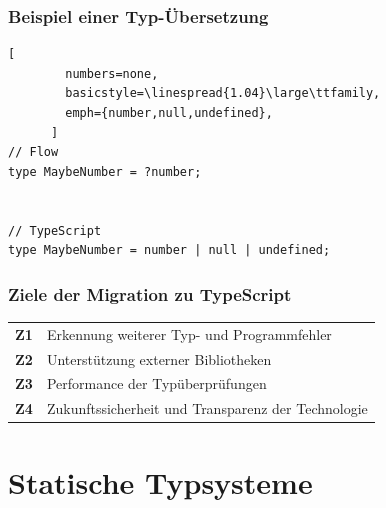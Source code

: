 
    \begin{frame}[fragile]
      \frametitle{Beispiel einer Typ-Übersetzung}

      \begin{lstlisting}[
        numbers=none,
        basicstyle=\linespread{1.04}\large\ttfamily,
        emph={number,null,undefined},
      ]
// Flow
type MaybeNumber = ?number;


// TypeScript
type MaybeNumber = number | null | undefined;
      \end{lstlisting}
    \end{frame}

    \begin{frame}
      \frametitle{Ziele der Migration zu TypeScript}
      {
        \renewcommand{\arraystretch}{1.4}
        \begin{tabu} to 
          \textbf{Z1} & Erkennung weiterer Typ- und Programmfehler \\
          \textbf{Z2} & Unterstützung externer Bibliotheken \\
          \textbf{Z3} & Performance der Typüberprüfungen \\
          \textbf{Z4} & Zukunftssicherheit und Transparenz der Technologie \\
        \end{tabu}
      }
    \end{frame}

  \section{Statische Typsysteme}


